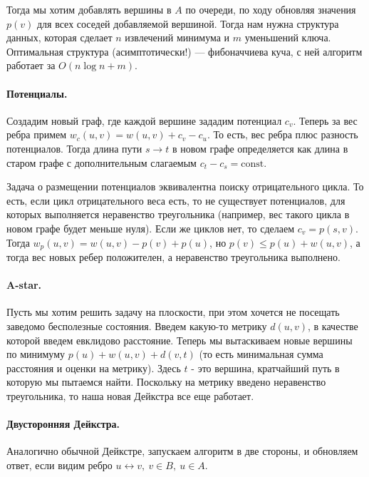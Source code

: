 \documentclass[12pt]{article}
\begin{document}
Тогда мы хотим добавлять вершины в $A$ по очереди, по ходу обновляя значения $p(v)$ для всех соседей добавляемой вершиной. Тогда нам нужна структура данных, которая сделает $n$ извлечений минимума и $m$ уменьшений ключа. Оптимальная структура (асимптотически!) --- фибоначчиева куча, с ней алгоритм работает за $O(n \log n + m)$.

\paragraph{Потенциалы.} Создадим новый граф, где каждой вершине зададим потенциал $c_v$. Теперь за вес ребра примем $w_c(u, v) = w(u, v) + c_v - c_u$. То есть, вес ребра плюс разность потенциалов. Тогда длина пути $s \rightarrow t$ в новом графе определяется как длина в старом графе с дополнительным слагаемым $c_t - c_s = \text{const}$.

Задача о размещении потенциалов эквивалентна поиску отрицательного цикла. То есть, если цикл отрицательного веса есть, то не существует потенциалов, для которых выполняется неравенство треугольника (например, вес такого цикла в новом графе будет меньше нуля). Если же циклов нет, то сделаем $c_v = p(s, v)$. Тогда $w_p(u, v) = w(u, v) - p(v) + p(u)$, но $p(v) \le p(u) + w(u, v)$, а тогда вес новых ребер положителен, а неравенство треугольника выполнено.

\paragraph{A-star.} Пусть мы хотим решить задачу на плоскости, при этом хочется не посещать заведомо бесполезные состояния. Введем какую-то метрику $d(u, v)$, в качестве которой введем евклидово расстояние. Теперь мы вытаскиваем новые вершины по минимуму $p(u) + w(u, v) + d(v, t)$ (то есть минимальная сумма расстояния и оценки на метрику). Здесь $t$ - это вершина, кратчайший путь в которую мы пытаемся найти. Поскольку на метрику введено неравенство треугольника, то наша новая Дейкстра все еще работает.

\paragraph{Двусторонняя Дейкстра.} Аналогично обычной Дейкстре, запускаем алгоритм в две стороны, и обновляем ответ, если видим ребро $u \leftrightarrow v,\ v \in B,\ u \in A$.
\end{document}
